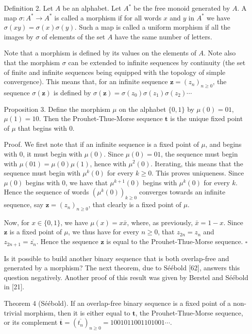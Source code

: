 \documentclass[10pt]{article}
\begin{document}
Definition 2. Let $A$ be an alphabet. Let $A^{*}$ be the free monoid generated by $A$. A map $\sigma: A^{*} \rightarrow A^{*}$ is called a morphism if for all words $x$ and $y$ in $A^{*}$ we have $\sigma(x y)=\sigma(x) \sigma(y)$. Such a map is called a uniform morphism if all the images by $\sigma$ of elements of the set $A$ have the same number of letters.

Note that a morphism is defined by its values on the elements of $A$. Note also that the morphism $\sigma$ can be extended to infinite sequences by continuity (the set of finite and infinite sequences being equipped with the topology of simple convergence). This means that, for an infinite sequence $\mathbf{z}=\left(z_{n}\right)_{n \geq 0}$, the sequence $\sigma(\mathbf{z})$ is defined by $\sigma(\mathbf{z})=\sigma\left(z_{0}\right) \sigma\left(z_{1}\right) \sigma\left(z_{2}\right) \cdots$

Proposition 3. Define the morphism $\mu$ on the alphabet $\{0,1\}$ by $\mu(0)=01$, $\mu(1)=10$. Then the Prouhet-Thue-Morse sequence $\mathbf{t}$ is the unique fixed point of $\mu$ that begins with 0.

Proof. We first note that if an infinite sequence is a fixed point of $\mu$, and begins with 0, it must begin with $\mu(0)$. Since $\mu(0)=01$, the sequence must begin with $\mu(01)=\mu(0) \mu(1)$, hence with $\mu^{2}(0)$. Iterating, this means that the sequence must begin with $\mu^{k}(0)$ for every $k \geq 0$. This proves uniqueness. Since $\mu(0)$ begins with 0, we have that $\mu^{k+1}(0)$ begins with $\mu^{k}(0)$ for every $k$. Hence the sequence of words $\left(\mu^{k}(0)\right)_{k \geq 0}$ converges towards an infinite sequence, say $\mathbf{z}=\left(z_{n}\right)_{n \geq 0}$, that clearly is a fixed point of $\mu$.

Now, for $x \in\{0,1\}$, we have $\mu(x)=x \bar{x}$, where, as previously, $\bar{x}=1-x$. Since $\mathbf{z}$ is a fixed point of $\mu$, we thus have for every $n \geq 0$, that $z_{2 n}=z_{n}$ and $z_{2 n+1}=\overline{z_{n}}$. Hence the sequence $\mathbf{z}$ is equal to the Prouhet-Thue-Morse sequence. \(\square\)

Is it possible to build another binary sequence that is both overlap-free and generated by a morphism? The next theorem, due to Séébold [62], answers this question negatively. Another proof of this result was given by Berstel and Séébold in [21].

Theorem 4 (Séébold). If an overlap-free binary sequence is a fixed point of a non-trivial morphism, then it is either equal to $\mathbf{t}$, the Prouhet-Thue-Morse sequence, or its complement $\overline{\mathbf{t}}=\left(\overline{t_{n}}\right)_{n \geq 0}=1001011001101001 \cdots$.
\end{document}
